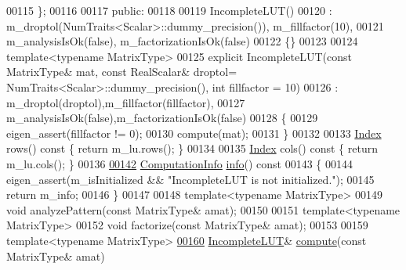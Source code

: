 \begin{DoxyCode}
00115     \};
00116 
00117   \textcolor{keyword}{public}:
00118     
00119     IncompleteLUT()
00120       : m\_droptol(NumTraits<Scalar>::dummy\_precision()), m\_fillfactor(10),
00121         m\_analysisIsOk(false), m\_factorizationIsOk(false)
00122     \{\}
00123     
00124     \textcolor{keyword}{template}<\textcolor{keyword}{typename} MatrixType>
00125     \textcolor{keyword}{explicit} IncompleteLUT(\textcolor{keyword}{const} MatrixType& mat, \textcolor{keyword}{const} RealScalar& droptol=
      NumTraits<Scalar>::dummy\_precision(), \textcolor{keywordtype}{int} fillfactor = 10)
00126       : m\_droptol(droptol),m\_fillfactor(fillfactor),
00127         m\_analysisIsOk(false),m\_factorizationIsOk(false)
00128     \{
00129       eigen\_assert(fillfactor != 0);
00130       compute(mat); 
00131     \}
00132     
00133     \hyperlink{namespace_eigen_a62e77e0933482dafde8fe197d9a2cfde}{Index} rows()\textcolor{keyword}{ const }\{ \textcolor{keywordflow}{return} m\_lu.rows(); \}
00134     
00135     \hyperlink{namespace_eigen_a62e77e0933482dafde8fe197d9a2cfde}{Index} cols()\textcolor{keyword}{ const }\{ \textcolor{keywordflow}{return} m\_lu.cols(); \}
00136 
\hyperlink{group___iterative_linear_solvers___module_a941c7d34f15d7bc287e780636be0ee2b}{00142}     \hyperlink{group__enums_ga85fad7b87587764e5cf6b513a9e0ee5e}{ComputationInfo} \hyperlink{group___iterative_linear_solvers___module_a941c7d34f15d7bc287e780636be0ee2b}{info}()\textcolor{keyword}{ const}
00143 \textcolor{keyword}{    }\{
00144       eigen\_assert(m\_isInitialized && \textcolor{stringliteral}{"IncompleteLUT is not initialized."});
00145       \textcolor{keywordflow}{return} m\_info;
00146     \}
00147     
00148     \textcolor{keyword}{template}<\textcolor{keyword}{typename} MatrixType>
00149     \textcolor{keywordtype}{void} analyzePattern(\textcolor{keyword}{const} MatrixType& amat);
00150     
00151     \textcolor{keyword}{template}<\textcolor{keyword}{typename} MatrixType>
00152     \textcolor{keywordtype}{void} factorize(\textcolor{keyword}{const} MatrixType& amat);
00153     
00159     \textcolor{keyword}{template}<\textcolor{keyword}{typename} MatrixType>
\hyperlink{group___iterative_linear_solvers___module_a488e37ab51d8ed37a297eeca521f1817}{00160}     \hyperlink{group___iterative_linear_solvers___module_class_eigen_1_1_incomplete_l_u_t}{IncompleteLUT}& \hyperlink{group___iterative_linear_solvers___module_a488e37ab51d8ed37a297eeca521f1817}{compute}(\textcolor{keyword}{const} MatrixType& amat)

\end{DoxyCode}
